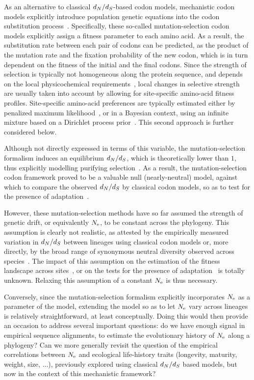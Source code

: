 \documentclass{article}
\begin{document}
As an alternative to classical $d_N / d_S$-based {codon} models, mechanistic {codon} models explicitly introduce population genetic equations into the {codon} {substitution} process~\citep{Halpern1998}.
Specifically, these so-called mutation-selection {codon} models explicitly assign a fitness parameter to each amino acid.
As a result, the {substitution} rate between each pair of codons can be predicted, as the product of the mutation rate and the fixation probability of the new {codon}, which is in turn dependent on the fitness of the initial and the final codons.
Since the strength of selection is typically not homogeneous along the protein sequence, and depends on the local physicochemical requirements~\citep{Echave2016, Goldstein2016,Goldstein2017}, local changes in selective strength are usually taken into account by allowing for site-specific amino-acid fitness profiles.
Site-specific amino-acid preferences are typically estimated either by penalized maximum likelihood~\citep{Tamuri2012,Tamuri2014}, or in a Bayesian context, using an infinite mixture based on a {Dirichlet process} prior~\citep{Rodrigue2010,Rodrigue2014}.
This second approach is further considered below.

Although not directly expressed in terms of this variable, the mutation-selection formalism induces an equilibrium $d_N / d_S$, which is theoretically lower than $1$, thus explicitly modelling purifying selection~\citep{Spielman2015, DosReis2015}.
As a result, the mutation-selection codon framework proved to be a valuable null (nearly-neutral) model, against which to compare the observed $d_N / d_S$ by classical {codon} models, so as to test for the presence of adaptation~\citep{Rodrigue2016, Bloom2017}.

However, these mutation-selection methods have so far assumed the strength of {genetic drift}, or equivalently $N_{\text{e}}$, to be constant across the phylogeny.
This assumption is clearly not realistic, as attested by the empirically measured variation in $d_N / d_S$ between lineages using classical {codon} models or, more directly, by the broad range of {synonymous} {neutral} diversity observed across species~\citep{Galtier2016}.
The impact of this assumption on the estimation of the fitness landscape across sites~\citep{Tamuri2014, Rodrigue2014}, or on the tests for the presence of adaptation~\citep{Rodrigue2016, Bloom2017} is totally unknown.
Relaxing this assumption of a constant $N_{\text{e}}$ is thus necessary.

Conversely, since the mutation-selection formalism explicitly incorporates $N_{\text{e}}$ as a parameter of the model, extending the model so as to let $N_{\text{e}}$ vary across lineages is relatively straightforward, at least conceptually.
Doing this would then provide an occasion to address several important questions: do we have enough signal in empirical sequence alignments, to estimate the evolutionary history of $N_{\text{e}}$ along a phylogeny?
Can we more generally revisit the question of the empirical correlations between $N_{\text{e}}$ and ecological life-history traits (longevity, maturity, weight, size, $\hdots$), previously explored using classical $d_N / d_S$ based models, but now in the context of this mechanistic framework?
\end{document}
